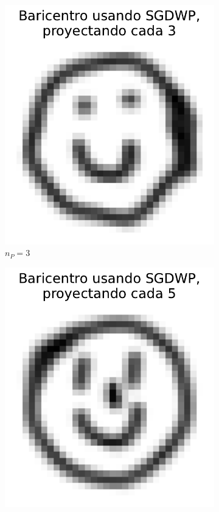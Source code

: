 \begin{figure}[htbp]
\begin{subfigure}[b]{0.23\textwidth}
        \centering
        \includegraphics[width=\textwidth]{img/sgdwp-pe/bar-SGDWP-pe-03.pdf}
        \caption{$n_P=3$}
        \label{fig:bar-SGDWP-pe-03}
    \end{subfigure}
    \hfill
    \begin{subfigure}[b]{0.23\textwidth}
        \centering
        \includegraphics[width=\textwidth]{img/sgdwp-pe/bar-SGDWP-pe-05.pdf}

\end{subfigure}
\end{figure}
